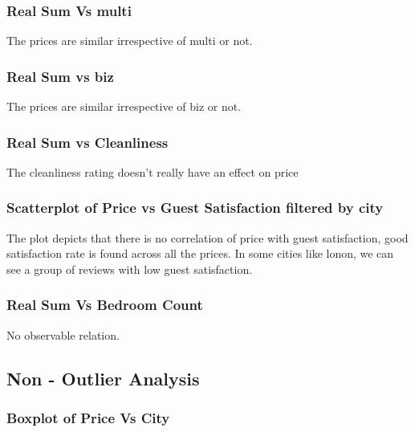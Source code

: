\documentclass[
]{article}
\begin{document}
\hypertarget{real-sum-vs-multi}{%
\subsubsection{Real Sum Vs multi}\label{real-sum-vs-multi}}

The prices are similar irrespective of multi or not.

\hypertarget{real-sum-vs-biz}{%
\subsubsection{Real Sum vs biz}\label{real-sum-vs-biz}}

The prices are similar irrespective of biz or not.

\hypertarget{real-sum-vs-cleanliness}{%
\subsubsection{Real Sum vs Cleanliness}\label{real-sum-vs-cleanliness}}

The cleanliness rating doesn't really have an effect on price

\hypertarget{scatterplot-of-price-vs-guest-satisfaction-filtered-by-city}{%
\subsubsection{Scatterplot of Price vs Guest Satisfaction filtered by
city}\label{scatterplot-of-price-vs-guest-satisfaction-filtered-by-city}}

The plot depicts that there is no correlation of price with guest
satisfaction, good satisfaction rate is found across all the prices. In
some cities like lonon, we can see a group of reviews with low guest
satisfaction.

\hypertarget{real-sum-vs-bedroom-count}{%
\subsubsection{Real Sum Vs Bedroom
Count}\label{real-sum-vs-bedroom-count}}

No observable relation.

\hypertarget{non---outlier-analysis}{%
\subsection{Non - Outlier Analysis}\label{non---outlier-analysis}}

\hypertarget{boxplot-of-price-vs-city}{%
\subsubsection{Boxplot of Price Vs
City}\label{boxplot-of-price-vs-city}}
\end{document}
